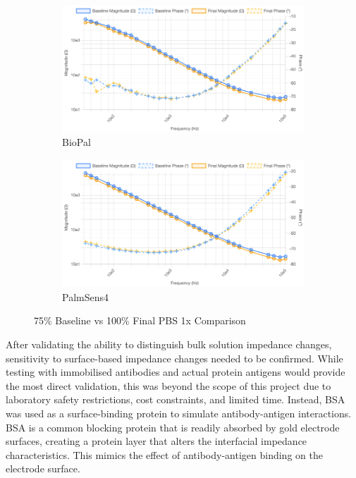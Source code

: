 \begin{figure}[H]
    \centering
    \begin{subfigure}{0.48\textwidth}
        \includegraphics[width=\textwidth]{PBS_75_cropped.png}   
        \caption{BioPal}
        \label{fig:75_pbs_biopal}
    \end{subfigure}
    \hfill
    \begin{subfigure}{0.48\textwidth}
        \includegraphics[width=\textwidth]{PalmSens_75.png}
        \caption{PalmSens4}
        \label{fig:75_pbs_palmsens}
    \end{subfigure}
    \caption{ 75\% Baseline vs 100\% Final PBS 1x Comparison}
    \label{fig:75_pbs_comparison}
\end{figure}


After validating the ability to distinguish bulk solution impedance changes, sensitivity to surface-based impedance changes needed to be confirmed. While testing with immobilised antibodies and actual protein antigens would provide the most direct validation, this was beyond the scope of this project due to laboratory safety restrictions, cost constraints, and limited time. Instead, BSA was used as a surface-binding protein to simulate antibody-antigen interactions. BSA is a common blocking protein that is readily absorbed by gold electrode surfaces, creating a protein layer that alters the interfacial impedance characteristics. This mimics the effect of antibody-antigen binding on the electrode surface.

